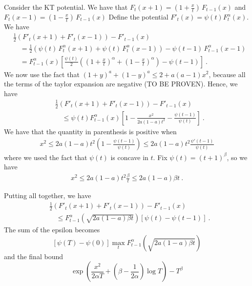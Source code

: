 \documentclass{colt2016_empty} %
\begin{document}
Consider the KT potential. We have that $F_t(x+1)=(1+\frac{x}{t}) \, F_{t-1}(x)$ and $F_t(x-1)=(1-\frac{x}{t}) \, F_{t-1}(x)$
Define the potential $F'_t(x)=\psi(t) F^\alpha_t(x)$.
We have
\begin{align}
&\frac{1}{2}\left(F'_t(x+1)+F'_t(x-1)\right) - F'_{t-1}(x) \\
&\quad = \frac{1}{2} \left(\psi(t) \, F^\alpha_t(x+1)+\psi(t) \, F^\alpha_t(x-1)\right)-\psi(t-1) \, F^\alpha_{t-1}(x-1) \\
&\quad = F^\alpha_{t-1}(x) \left[\frac{\psi(t)}{2} \left(  (1+\frac{x}{t})^\alpha +(1-\frac{x}{t})^\alpha \right) -\psi(t-1) \right]~.
\end{align}
We now use the fact that $(1+y)^a+(1-y)^a \leq 2+a(a-1)x^2$, because all the terms of the taylor expansion are negative (TO BE PROVEN).
Hence, we have
\begin{align}
&\frac{1}{2}\left(F'_t(x+1)+F'_t(x-1)\right) - F'_{t-1}(x) \\
&\quad \leq \psi(t) F^\alpha_{t-1}(x) \left[1-\frac{x^2}{2a(1-a)t^2} -\frac{\psi(t-1)}{\psi(t)} \right]~.
\end{align}
We have that the quantity in parenthesis is positive when
\begin{align}
x^2 \leq 2a(1-a) t^2 (1-\frac{\psi(t-1)}{\psi(t)}) \leq 2a(1-a) t^2 \frac{\psi'(t-1)}{\psi(t)}
\end{align}
where we used the fact that $\psi(t)$ is concave in $t$.
Fix $\psi(t)=(t+1)^\beta$, so we have
\begin{align}
x^2 \leq 2a(1-a) t^2 \frac{\beta }{t} \leq 2a(1-a) \beta t ~.
\end{align}

Putting all together, we have
\begin{align}
&\frac{1}{2}\left(F'_t(x+1)+F'_t(x-1)\right) - F'_{t-1}(x) \\
&\quad \leq F^\alpha_{t-1}(\sqrt{2a(1-a) \beta t}) \left[\psi(t)-\psi(t-1) \right]~.
\end{align}
The sum of the epsilon becomes 
\[
\left[\psi(T)-\psi(0) \right] \max_t F^\alpha_{t-1}(\sqrt{2a(1-a) \beta t}) 
\]
and the final bound
\[
\exp\left( \frac{x^2}{2 \alpha T} +(\beta-\frac{1}{2\alpha})\log T\right) - T^\beta
\]


\end{document}

